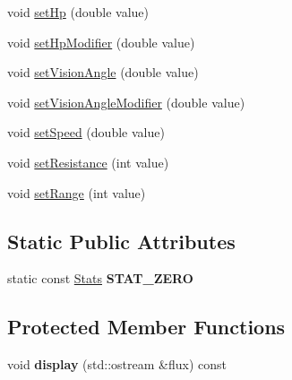 \begin{DoxyCompactItemize}
void \hyperlink{class_stats_a43ee86ea7f89274cb062bf4e734a3f3d}{set\+Hp} (double value)
\item 
void \hyperlink{class_stats_adce30d266f8b25a5ddeff6502f464817}{set\+Hp\+Modifier} (double value)
\item 
void \hyperlink{class_stats_abf32f81c05af8741fdbaa400e85dae3e}{set\+Vision\+Angle} (double value)
\item 
void \hyperlink{class_stats_a583221c3a26a9bcd185938d72411ea4a}{set\+Vision\+Angle\+Modifier} (double value)
\item 
void \hyperlink{class_stats_a07f92b657947fcd6960a00e3d5613efb}{set\+Speed} (double value)
\item 
void \hyperlink{class_stats_ae6c7536b7b5ff066f949df8834cf4a34}{set\+Resistance} (int value)
\item 
void \hyperlink{class_stats_aa5033fdc23eb570149addc460ee4dbf6}{set\+Range} (int value)
\end{DoxyCompactItemize}
\subsection*{Static Public Attributes}
\begin{DoxyCompactItemize}
\item 
static const \hyperlink{class_stats}{Stats} {\bfseries S\+T\+A\+T\+\_\+\+Z\+E\+RO}\hypertarget{class_stats_a90d9034c8327f70e69e7c134aa0cec17}{}\label{class_stats_a90d9034c8327f70e69e7c134aa0cec17}

\end{DoxyCompactItemize}
\subsection*{Protected Member Functions}
\begin{DoxyCompactItemize}
\item 
void {\bfseries display} (std\+::ostream \&flux) const \hypertarget{class_stats_a19d5d9ca87cad69759ff75443480ecb0}{}\label{class_stats_a19d5d9ca87cad69759ff75443480ecb0}

\end{DoxyCompactItemize}
